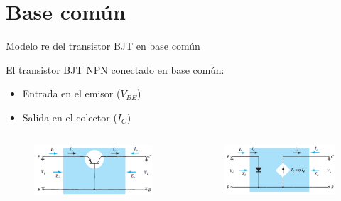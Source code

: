 \documentclass[t,aspectratio=169]{beamer}
\begin{document}
\section{Base común}
\begin{frame}{Modelo re del transistor BJT en base común}

El transistor BJT NPN conectado en base común:

\begin{itemize}
    \item Entrada en el emisor ($V_{BE}$)
    \item Salida en el colector ($I_C$)
\end{itemize}

\begin{columns}
\begin{column}{0.5\textwidth}

\begin{figure}[H]
    \centering
    \includegraphics[width=\textwidth]{figuras/modelo_re_base_comun_1.png}
\end{figure}

\end{column}
\begin{column}{0.5\textwidth}

\begin{figure}[H]
    \centering
    \includegraphics[width=\textwidth]{figuras/modelo_re_base_comun_2.png}
\end{figure}

\end{column}
\end{columns}

\end{frame}
\end{document}
